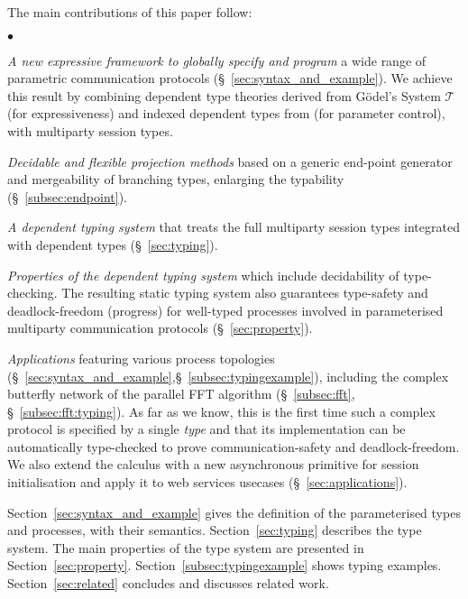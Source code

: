 \documentclass{LMCS}
\begin{document}
The main contributions of this paper follow:
\begin{iteMize}{$\bullet$}
\item {\em A new expressive framework to globally specify and program}
a wide range of
parametric communication protocols
(\S~\ref{sec:syntax_and_example}). We achieve this result by
combining dependent type theories derived from
G\"odel's System $\mathcal{T}$
\cite{DBLP:conf/mfps/Nelson91} (for expressiveness)
and indexed dependent types from \cite{DBLP:conf/popl/XiP99} (for parameter
control), with multiparty session types.

\item
{\em Decidable and flexible projection methods}
based on a generic end-point generator
and mergeability of branching types, enlarging the typability
(\S~\ref{subsec:endpoint}).

\item {\em A dependent typing system} that treats the full
multiparty session types integrated with dependent types (\S~\ref{sec:typing}).

\item {\em Properties of the dependent typing system}
which include
decidability of
  type-checking.
The resulting static typing system also
guarantees type-safety and deadlock-freedom (progress) for
well-typed processes involved in parameterised multiparty communication
protocols (\S~\ref{sec:property}).

\item {\em Applications} featuring various process topologies
(\S~\ref{sec:syntax_and_example},\S~\ref{subsec:typingexample}),
  including the complex butterfly network of the parallel
  FFT algorithm
(\S~\ref{subsec:fft}, \S~\ref{subsec:fft:typing}).
As far as we know, this is the first time
such a complex protocol is specified by
a single {\em type} and that its implementation can be automatically
type-checked
to prove communication-safety and deadlock-freedom.
We also extend the calculus with a new asynchronous
primitive for session initialisation and apply it to web services usecases
\cite{CDLRequirements} (\S~\ref{sec:applications}).
\end{iteMize}

\noindent Section~\ref{sec:syntax_and_example} gives the definition of the parameterised
types and processes, with their semantics. Section~\ref{sec:typing} describes
the type system. The main properties of the type system are presented in
Section~\ref{sec:property}. Section~\ref{subsec:typingexample} shows typing
examples. Section~\ref{sec:related} concludes and discusses related work.
\end{document}
